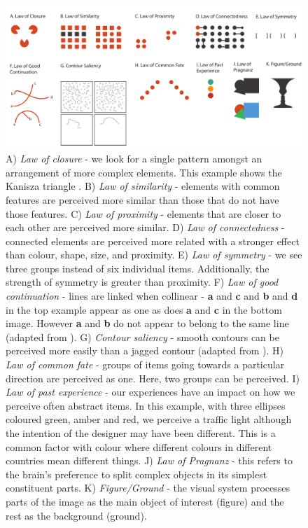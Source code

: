 \begin{figure}[h!]
\centering
\includegraphics[width=\textwidth]{images/related-work/gestalt.pdf}
\caption{A) \emph{Law of closure} - we look for a single pattern amongst an arrangement of more complex elements. This example shows the Kanisza triangle \cite{ginsburg1975illusory}. 
B) \emph{Law of similarity} - elements with common features are perceived more similar than those that do not have those features. 
C) \emph{Law of proximity} - elements that are closer to each other are perceived more similar. 
D) \emph{Law of connectedness} - connected elements are perceived more related with a stronger effect than colour, shape, size, and proximity. 
E) \emph{Law of symmetry} - we see three groups instead of six individual items. Additionally, the strength of symmetry is greater than proximity. 
F) \emph{Law of good continuation} -  lines are linked when collinear - \textbf{a} and \textbf{c} and \textbf{b} and \textbf{d} in the top example appear as one as does \textbf{a} and \textbf{c} in the bottom image. However \textbf{a} and \textbf{b} do not appear to belong to the same line (adapted from \cite{kandel2012principles}). 
G) \emph{Contour saliency} - smooth contours can be perceived more easily than a jagged contour (adapted from \cite{kandel2012principles}). 
H) \emph{Law of common fate} - groups of items going towards a particular direction are perceived as one. Here, two groups can be perceived. 
I) \emph{Law of past experience} - our experiences have an impact on how we perceive often abstract items. In this example, with three ellipses coloured green, amber and red, we perceive a traffic light although the intention of the designer may have been different. This is a common factor with colour where different colours in different countries mean different things. 
J) \emph{Law of Pragnanz} - this refers to the brain's preference to split complex objects in its simplest constituent parts.
K) \emph{Figure/Ground} - the visual system processes parts of the image as the main object of interest (figure) and the rest as the background (ground).}

\label{fig:gestalt}
\end{figure}


